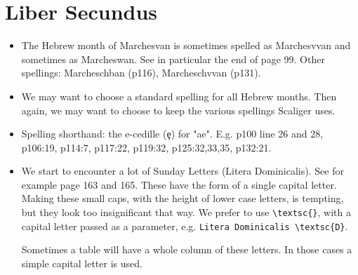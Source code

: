 \documentclass{report}
\begin{document}
\section{Liber Secundus}
\begin{itemize}
\item
The Hebrew month of Marchesvan is sometimes spelled as Marchesvvan and
sometimes as Marcheswan. See in particular the end of page 99.
Other spellings: Marcheschban (p116), Marcheschvvan (p131).
\item
We may want to choose a standard spelling for all Hebrew months.
Then again, we may want to choose to keep the various spellings Scaliger uses.
\item
Spelling shorthand: the e-cedille (ȩ) for "ae".
E.g. p100 line 26 and 28, p106:19, p114:7, p117:22, p119:32,
p125:32,33,35, p132:21.
\item
We start to encounter a lot of Sunday Letters (Litera Dominicalis).
See for example page 163 and 165.
These have the form of a single capital letter.
Making these small caps, with the height of lower case letters,
is tempting, but they look too insignificant that way.
We prefer to use \verb+\textsc{}+, with a capital letter passed as a parameter,
e.g. \verb+Litera Dominicalis \textsc{D}+.

Sometimes a table will have a whole column of these letters.
In those cases a simple capital letter is used.
\end{itemize}
\end{document}
